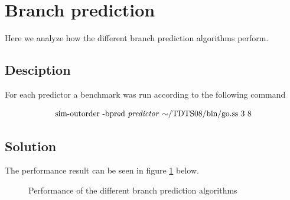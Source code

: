 \documentclass[titlepage, a4paper]{article}
\begin{document}
\section{Branch prediction}
Here we analyze how the different branch prediction algorithms perform.

\subsection{Desciption}
For each predictor a benchmark was run according to the following command

$$\text{sim-outorder -bpred \textit{predictor} $\mathtt{\sim}$/TDTS08/bin/go.ss 3 8}$$


\subsection{Solution}
The performance result can be seen in figure \ref{fig:performance} below.

\begin{figure}[H]
	\centering
	\caption{Performance of the different branch prediction algorithms}
	\label{fig:performance}
\end{figure}
\end{document}
